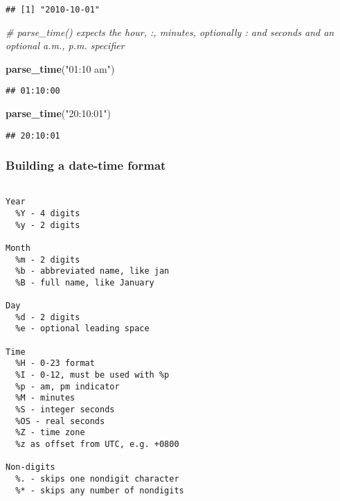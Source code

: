 \documentclass[]{article}
\newenvironment{Shaded}{\begin{snugshade}}{\end{snugshade}}
\newcommand{\KeywordTok}[1]{\textcolor[rgb]{0.13,0.29,0.53}{\textbf{#1}}}
\newcommand{\StringTok}[1]{\textcolor[rgb]{0.31,0.60,0.02}{#1}}
\newcommand{\CommentTok}[1]{\textcolor[rgb]{0.56,0.35,0.01}{\textit{#1}}}
\newcommand{\NormalTok}[1]{#1}
\begin{document}
\begin{verbatim}
## [1] "2010-10-01"
\end{verbatim}

\begin{Shaded}
\begin{Highlighting}[]
\CommentTok{# parse_time() expects the hour, :, minutes, optionally : and seconds and an optional a.m., p.m. specifier}

\KeywordTok{parse_time}\NormalTok{(}\StringTok{"01:10 am"}\NormalTok{)}
\end{Highlighting}
\end{Shaded}

\begin{verbatim}
## 01:10:00
\end{verbatim}

\begin{Shaded}
\begin{Highlighting}[]
\KeywordTok{parse_time}\NormalTok{(}\StringTok{"20:10:01"}\NormalTok{)}
\end{Highlighting}
\end{Shaded}

\begin{verbatim}
## 20:10:01
\end{verbatim}

\subsubsection{Building a date-time
format}\label{building-a-date-time-format}

\begin{verbatim}

Year
  %Y - 4 digits
  %y - 2 digits

Month
  %m - 2 digits
  %b - abbreviated name, like jan
  %B - full name, like January

Day
  %d - 2 digits
  %e - optional leading space
  
Time
  %H - 0-23 format
  %I - 0-12, must be used with %p
  %p - am, pm indicator
  %M - minutes
  %S - integer seconds
  %OS - real seconds
  %Z - time zone 
  %z as offset from UTC, e.g. +0800
  
Non-digits
  %. - skips one nondigit character
  %* - skips any number of nondigits
  
\end{verbatim}

\begin{Shaded}
\end{Shaded}
\end{document}
